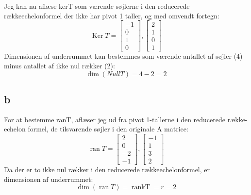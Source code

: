 \documentclass{article}
\begin{document}
Jeg kan nu aflæse kerT som værende søjlerne i den reducerede rækkeechelonformel der ikke har pivot 1 taller, og med omvendt fortegn:
$$
\operatorname{Ker} T=\left[\begin{array}{c}
-1 \\
0 \\
1 \\
0
\end{array}\right],\left[\begin{array}{l}
2 \\
1 \\
0 \\
1
\end{array}\right]
$$
Dimensionen af underrummet kan bestemmes som værende antallet af søjler (4) minus antallet af ikke nul rækker (2):
$$
\operatorname{dim}(N u l l T)=4-2=2
$$
\subsection*{b}
For at bestemme ranT, aflæser jeg ud fra pivot 1-tallerne i den reducerede række-echelon formel, de tilsvarende søjler i den originale A matrice:
$$
\operatorname{ran} T=\left[\begin{array}{c}
2 \\
0 \\
-2 \\
-1
\end{array}\right],\left[\begin{array}{c}
-1 \\
1 \\
3 \\
2
\end{array}\right]
$$
Da der er to ikke nul rækker i den reducerede rækkeechelonformel, er dimensionen af underrummet:
$$
\operatorname{dim}(\operatorname{ran} T)=\operatorname{rankT}=r=2
$$
\end{document}
